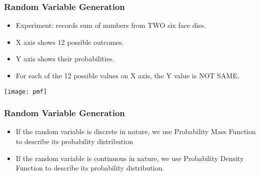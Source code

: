 \begin{frame}\frametitle{Random Variable Generation}
\begin{itemize}
\item  Experiment: records sum of numbers from TWO six face dies.
\item X axis shows 12 possible outcomes.
\item Y axis shows their probabilities.
\item For each of the 12 possible values on X axis, the Y value is NOT SAME.
\end{itemize}

\begin{center}
\texttt{[image: pmf]}
\end{center}
\end{frame}

\begin{frame}\frametitle{Random Variable Generation}
\begin{itemize}
\item  If the random variable is discrete in nature, we use Probability Mass
Function to describe its probability distribution
\item If the random variable is continuous in nature, we use Probability
Density Function to describe its probability distribution.
\end{itemize}
\end{frame}
